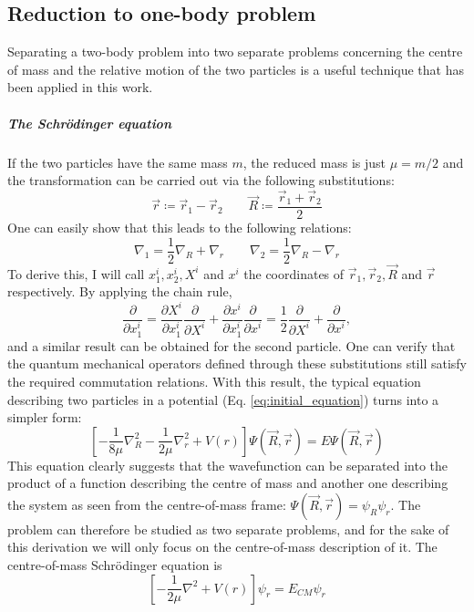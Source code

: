 \begin{appendices}
\chapter{Reduction to one-body problem}\label{appendix:onebody}
Separating a two-body problem into two separate problems concerning the centre of mass and the relative motion of the two particles is a useful technique that has been applied in this work.

\paragraph{The Schrödinger equation}
If the two particles have the same mass \(m\), the reduced mass is just \(\mu = m /2\) and the transformation can be carried out via the following substitutions:
\begin{equation}\label{eq:twobody_transform}
	\vec{r}\coloneqq \vec{r}_1 - \vec{r}_2 \qquad
	\vec{R} \coloneqq \frac{\vec{r}_1 + \vec{r}_2}{2}
\end{equation}
One can easily show that this leads to the following relations:
\begin{equation}
	\nabla _1 = \frac{1}{2} \nabla _R + \nabla _r
	\qquad
	\nabla _2 = \frac{1}{2} \nabla _R - \nabla _r
\end{equation}
To derive this, I will call \(x^i_1, x^i_2, X^i \) and \(x^i\) the coordinates of \(\vec{r}_1, \vec{r}_2, \vec{R} \) and \(\vec{r}\) respectively. By applying the chain rule,
\begin{equation}
	\frac{\partial }{\partial x^i_1} = \frac{\partial X^i}{\partial x^i_1} \frac{\partial }{\partial X^i} + \frac{\partial x^i}{\partial x^i_1} \frac{\partial }{\partial x^i} = \frac{1}{2} \frac{\partial }{\partial X^i} + \frac{\partial }{\partial x^i},
\end{equation}
and a similar result can be obtained for the second particle. One can verify that the quantum mechanical operators defined through these substitutions still satisfy the required commutation relations. With this result, the typical equation describing two particles in a potential (Eq. \eqref{eq:initial_equation}) turns into a simpler form:
\begin{equation}
	\left[- \frac{1}{8\mu} \nabla _R^{2} - \frac{1}{2\mu } \nabla _r^2 + V(r)\right] \Psi (\vec{R},\vec{r})= E \Psi (\vec{R},\vec{r})
\end{equation}
This equation clearly suggests that the wavefunction can be separated into the product of a function describing the centre of mass and another one describing the system as seen from the centre-of-mass frame: \(\Psi (\vec{R},\vec{r}) = \psi_R \psi _r\). The problem can therefore be studied as two separate problems, and for the sake of this derivation we will only focus on the centre-of-mass description of it. The centre-of-mass Schrödinger equation is
\begin{equation}
	\left[- \frac{1}{2\mu }\nabla^2 + V(r)\right]\psi _r = E_{CM} \psi _r
\end{equation}


\end{appendices}
